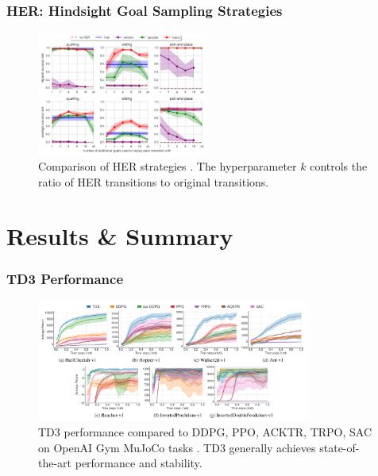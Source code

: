 \documentclass[9pt, aspectratio=169]{beamer}
\begin{document}
\begin{frame}
  \frametitle{HER: Hindsight Goal Sampling Strategies}
    \begin{figure}
        \centering
        \includegraphics[width=0.5\textwidth]{her-strategies.png}
        \caption{Comparison of HER strategies \cite{andrychowicz2018hindsightexperiencereplay}. The hyperparameter $k$ controls the ratio of HER transitions to original transitions.}
    \end{figure}
\end{frame}


\section{Results \& Summary}

\begin{frame}
  \frametitle{TD3 Performance}
    \begin{figure}
        \centering
        \includegraphics[width=0.8\textwidth]{td3-performance.png}
        \caption{TD3 performance compared to DDPG, PPO, ACKTR, TRPO, SAC on OpenAI Gym MuJoCo tasks \cite{fujimoto2018addressingfunctionapproximationerror}. TD3 generally achieves state-of-the-art performance and stability.}
    \end{figure}
\end{frame}
\end{document}
